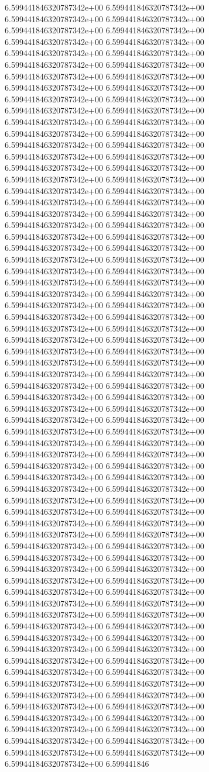 6.599441846320787342e+00	6.599441846320787342e+00	6.599441846320787342e+00	6.599441846320787342e+00	6.599441846320787342e+00	6.599441846320787342e+00	6.599441846320787342e+00	6.599441846320787342e+00	6.599441846320787342e+00	6.599441846320787342e+00	6.599441846320787342e+00	6.599441846320787342e+00	6.599441846320787342e+00	6.599441846320787342e+00	6.599441846320787342e+00	6.599441846320787342e+00	6.599441846320787342e+00	6.599441846320787342e+00	6.599441846320787342e+00	6.599441846320787342e+00	6.599441846320787342e+00	6.599441846320787342e+00	6.599441846320787342e+00	6.599441846320787342e+00	6.599441846320787342e+00	6.599441846320787342e+00	6.599441846320787342e+00	6.599441846320787342e+00	6.599441846320787342e+00	6.599441846320787342e+00	6.599441846320787342e+00	6.599441846320787342e+00	6.599441846320787342e+00	6.599441846320787342e+00	6.599441846320787342e+00	6.599441846320787342e+00	6.599441846320787342e+00	6.599441846320787342e+00	6.599441846320787342e+00	6.599441846320787342e+00	6.599441846320787342e+00	6.599441846320787342e+00	6.599441846320787342e+00	6.599441846320787342e+00	6.599441846320787342e+00	6.599441846320787342e+00	6.599441846320787342e+00	6.599441846320787342e+00	6.599441846320787342e+00	6.599441846320787342e+00	6.599441846320787342e+00	6.599441846320787342e+00	6.599441846320787342e+00	6.599441846320787342e+00	6.599441846320787342e+00	6.599441846320787342e+00	6.599441846320787342e+00	6.599441846320787342e+00	6.599441846320787342e+00	6.599441846320787342e+00	6.599441846320787342e+00	6.599441846320787342e+00	6.599441846320787342e+00	6.599441846320787342e+00	6.599441846320787342e+00	6.599441846320787342e+00	6.599441846320787342e+00	6.599441846320787342e+00	6.599441846320787342e+00	6.599441846320787342e+00	6.599441846320787342e+00	6.599441846320787342e+00	6.599441846320787342e+00	6.599441846320787342e+00	6.599441846320787342e+00	6.599441846320787342e+00	6.599441846320787342e+00	6.599441846320787342e+00	6.599441846320787342e+00	6.599441846320787342e+00	6.599441846320787342e+00	6.599441846320787342e+00	6.599441846320787342e+00	6.599441846320787342e+00	6.599441846320787342e+00	6.599441846320787342e+00	6.599441846320787342e+00	6.599441846320787342e+00	6.599441846320787342e+00	6.599441846320787342e+00	6.599441846320787342e+00	6.599441846320787342e+00	6.599441846320787342e+00	6.599441846320787342e+00	6.599441846320787342e+00	6.599441846320787342e+00	6.599441846320787342e+00	6.599441846320787342e+00	6.599441846320787342e+00	6.599441846320787342e+00	6.599441846320787342e+00	6.599441846320787342e+00	6.599441846320787342e+00	6.599441846320787342e+00	6.599441846320787342e+00	6.599441846320787342e+00	6.599441846320787342e+00	6.599441846320787342e+00	6.599441846320787342e+00	6.599441846320787342e+00	6.599441846320787342e+00	6.599441846320787342e+00	6.599441846320787342e+00	6.599441846320787342e+00	6.599441846320787342e+00	6.599441846320787342e+00	6.599441846320787342e+00	6.599441846320787342e+00	6.599441846320787342e+00	6.599441846320787342e+00	6.599441846320787342e+00	6.599441846320787342e+00	6.599441846320787342e+00	6.599441846320787342e+00	6.599441846320787342e+00	6.599441846320787342e+00	6.599441846320787342e+00	6.599441846320787342e+00	6.599441846320787342e+00	6.599441846320787342e+00	6.599441846320787342e+00	6.599441846320787342e+00	6.599441846320787342e+00	6.599441846